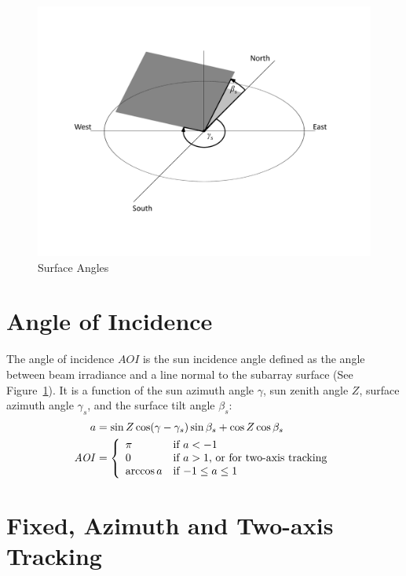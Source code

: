 \documentclass[12pt,letterpaper]{article}
\newcommand\AOI{\ensuremath{\mathit{AOI}}}
\begin{document}
\begin{figure}
\begin{center}
\includegraphics[scale=0.6]{surface-angles}
\caption{Surface Angles}
\label{fig-arrayorientation}
\end{center}
\end{figure}

\section{Angle of Incidence} \label{sec-theta}

The angle of incidence $\AOI$ is the sun incidence angle defined as the angle between beam irradiance and a line normal to the subarray surface (See Figure~\ref{fig-arrayorientation}). It is a function of the sun azimuth angle $\gamma$, sun zenith angle $Z$, surface azimuth angle $\gamma_s$, and the surface tilt angle $\beta_s$:
\begin{align}\label{eqn-inc}
a &= \sin Z \cos(\gamma - \gamma_s) \sin\beta_s + \cos Z \cos\beta_s \notag\\
\AOI &= \left\{
\begin{array}{ll}
\pi & \text{if $a<-1$}\\
0 & \text{if $a>1$, or for two-axis tracking}\\
\arccos a & \text{if $-1 \leq a \leq 1$}
\end{array}
\right.
\end{align}

\section{Fixed, Azimuth and Two-axis Tracking}
\end{document}

